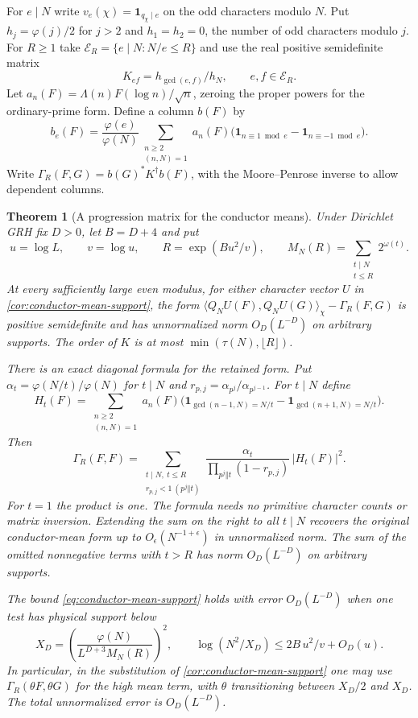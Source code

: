 \documentclass[11pt,a4paper]{article}
\numberwithin{equation}{section}
\newtheorem{theorem}{Theorem}[section]
\begin{document}
For $e\mid N$ write $v_e(\chi)=\mathbf1_{q_\chi\mid e}$ on the
odd characters modulo $N$. Put $h_j=\varphi(j)/2$ for $j>2$ and
$h_1=h_2=0$, the number of odd characters modulo $j$.
For $R\ge1$ take $\mathcal E_R=\{e\mid N:N/e\le R\}$ and use
the real positive semidefinite matrix
\[
 K_{ef}=h_{\gcd(e,f)}/h_N,\qquad e,f\in\mathcal E_R .
\]
Let $a_n(F)=\Lambda(n)F(\log n)/\sqrt n$, zeroing the proper
powers for the ordinary-prime form. Define a column $b(F)$ by
\begin{equation}
 b_e(F)=\frac{\varphi(e)}{\varphi(N)}
 \sum_{\substack{n\ge2\\(n,N)=1}}a_n(F)
    \big(\mathbf1_{n\equiv1\bmod e}-\mathbf1_{n\equiv-1\bmod e}\big).
 \label{eq:conductor-two-classes}
\end{equation}
Write $\Gamma_R(F,G)=b(G)^*K^\dagger b(F)$, with the
Moore--Penrose inverse to allow dependent columns.

\begin{theorem}[A progression matrix for the conductor means]
\label{thm:conductor-progression-gram}
Under Dirichlet GRH fix $D>0$, let $B=D+4$ and put
\[
 u=\log L,\qquad v=\log u,\qquad R=\exp(Bu^2/v),\qquad
 M_N(R)=\sum_{\substack{t\mid N\\t\le R}}2^{\omega(t)}.
\]
At every sufficiently large even modulus, for either character
vector $U$ in \cref{cor:conductor-mean-support}, the form
$\langle Q_NU(F),Q_NU(G)\rangle_\chi-\Gamma_R(F,G)$ is positive
semidefinite and has unnormalized norm $O_D(L^{-D})$ on arbitrary
supports. The order of $K$ is at most $\min(\tau(N),\lfloor R\rfloor)$.

There is an exact diagonal formula for the retained form. Put
$\alpha_t=\varphi(N/t)/\varphi(N)$ for $t\mid N$ and
$r_{p,j}=\alpha_{p^j}/\alpha_{p^{j-1}}$. For $t\mid N$ define
\[
 H_t(F)=\sum_{\substack{n\ge2\\(n,N)=1}}a_n(F)
 \big(\mathbf1_{\gcd(n-1,N)=N/t}-\mathbf1_{\gcd(n+1,N)=N/t}\big).
\]
Then
\begin{equation}
 \Gamma_R(F,F)=
 \sum_{\substack{t\mid N,\ t\le R\\r_{p,j}<1\ (p^j\Vert t)}}
  \frac{\alpha_t}{\prod_{p^j\Vert t}(1-r_{p,j})}\,|H_t(F)|^2 .
 \label{eq:conductor-gcd-squares}
\end{equation}
For $t=1$ the product is one. The formula needs no primitive
character counts or matrix inversion. Extending the sum on the
right to \emph{all} $t\mid N$ recovers the original conductor-mean
form up to $O_\epsilon(N^{-1+\epsilon})$ in unnormalized norm.
The sum of the omitted nonnegative terms with $t>R$ has norm
$O_D(L^{-D})$ on arbitrary supports.

The bound \eqref{eq:conductor-mean-support} holds with error
$O_D(L^{-D})$ when one test has physical support below
\[
 X_D=\left(\frac{\varphi(N)}{L^{D+3}M_N(R)}\right)^2,\qquad
 \log(N^2/X_D)\le 2B\,u^2/v+O_D(u).
\]
In particular, in the substitution of
\cref{cor:conductor-mean-support} one may use $\Gamma_R(\theta F,\theta G)$
for the high mean term, with $\theta$ transitioning between
$X_D/2$ and $X_D$. The total unnormalized error is $O_D(L^{-D})$.
\end{theorem}
\end{document}
